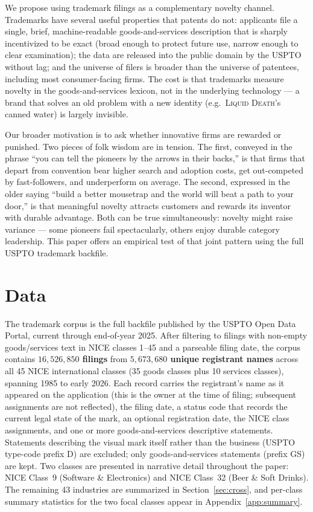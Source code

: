 \documentclass[11pt]{article}
\begin{document}
We propose using trademark filings as a complementary novelty channel.
Trademarks have several useful properties that patents do not: applicants
file a single, brief, machine-readable goods-and-services description that
is sharply incentivized to be exact (broad enough to protect future use,
narrow enough to clear examination); the data are released into the
public domain by the USPTO without lag; and the universe of filers is
broader than the universe of patentees, including most consumer-facing
firms. The cost is that trademarks measure novelty in the
goods-and-services lexicon, not in the underlying technology --- a brand
that solves an old problem with a new identity (e.g.\ \textsc{Liquid Death}'s
canned water) is largely invisible.

Our broader motivation is to ask whether innovative firms are rewarded or
punished. Two pieces of folk wisdom are in tension. The first, conveyed
in the phrase ``you can tell the pioneers by the arrows in their backs,''
is that firms that depart from convention bear higher search and adoption
costs, get out-competed by fast-followers, and underperform on average.
The second, expressed in the older saying ``build a better mousetrap and
the world will beat a path to your door,'' is that meaningful novelty
attracts customers and rewards its inventor with durable advantage. Both
can be true simultaneously: novelty might raise variance --- some
pioneers fail spectacularly, others enjoy durable category leadership.
This paper offers an empirical test of that joint pattern using the full
USPTO trademark backfile.

\section{Data}

The trademark corpus is the full backfile published by the USPTO Open
Data Portal, current through end-of-year 2025. After filtering to
filings with non-empty goods/services text in NICE classes 1--45 and
a parseable filing date, the corpus contains
\textbf{$16{,}526{,}850$ filings} from \textbf{$5{,}673{,}680$ unique
registrant names} across all 45 NICE international classes (35 goods
classes plus 10 services classes), spanning 1985 to early 2026. Each
record carries the registrant's name as it appeared on the
application (this is the owner at the time of filing; subsequent
assignments are not reflected), the filing date, a status code that
records the current legal state of the mark, an optional registration
date, the NICE class assignments, and one or more goods-and-services
descriptive statements. Statements describing the visual mark itself
rather than the business (USPTO type-code prefix D) are excluded;
only goods-and-services statements (prefix GS) are kept. Two classes
are presented in narrative detail throughout the paper: NICE Class~9
(Software \& Electronics) and NICE Class~32 (Beer \& Soft Drinks).
The remaining 43 industries are summarized in
Section~\ref{sec:cross}, and per-class summary statistics for the two
focal classes appear in Appendix~\ref{app:summary}.
\end{document}
